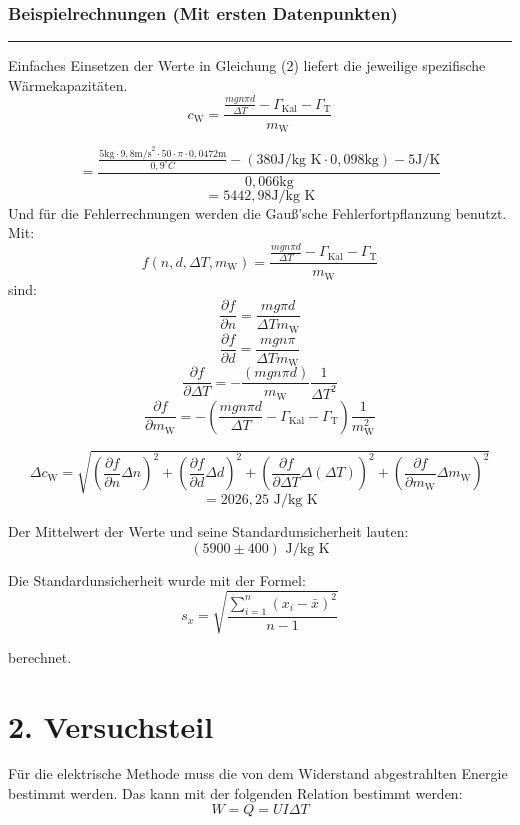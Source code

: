 \documentclass[11pt,a4paper]{article} %
\begin{document}
\subsubsection{Beispielrechnungen (Mit ersten Datenpunkten)}
\hrule
\begin{tcolorbox}[colback=white]
Einfaches Einsetzen der Werte in Gleichung (2) liefert die jeweilige spezifische Wärmekapazitäten. 
$$c_\textrm{W} = \frac{\frac{mgn\pi d}{\Delta T} - \Gamma_{\textrm{Kal}} - \Gamma_{\textrm{T}}}{m_\textrm{W}}$$

$$ =\frac{ \frac{ 5 \textrm{kg} \cdot 9,8 \textrm{m/s}^2 \cdot 50 \cdot \pi \cdot 0,0472 \textrm{m}}{0,9^\circ C} - (380 \textrm{J/kg K} \cdot 0,098 \textrm{kg}) - 5 \textrm{J/K}}{0,066\textrm{kg}}$$
$$ = 5442,98 \textrm{J/kg K} $$
Und für die Fehlerrechnungen werden die Gauß'sche Fehlerfortpflanzung benutzt. Mit:
$$f(n,d,\Delta T,m_\textrm{W}) = \frac{\frac{mgn\pi d}{\Delta T} - \Gamma_{\textrm{Kal}} - \Gamma_{\textrm{T}}}{m_\textrm{W}}$$
sind:
$$ \frac{ \partial f}{\partial n} = \frac{mg\pi d}{\Delta T m_{\textrm{W}}} $$ 
$$ \frac{ \partial f}{\partial d}  = \frac{mgn\pi}{\Delta Tm_{\textrm{W}}}$$
$$ \frac{\partial f}{\partial \Delta T} = -\frac{(mgn\pi d)}{m_\textrm{W}} \frac{1}{\Delta T ^2}$$
$$ \frac{\partial f}{\partial m_{\textrm{W}}} = -(\frac{mgn\pi d}{\Delta T} - \Gamma_{\textrm{Kal}} - \Gamma_{\textrm{T}})
 \frac{1}{m_\textrm{W}^2}$$

$$\Delta c_\textrm{W} = \sqrt{ 
	(\frac{ \partial f}{\partial n} \Delta n)^2
	+(\frac{ \partial f}{\partial d} \Delta d)^2
	+(\frac{\partial f}{\partial \Delta T} \Delta (\Delta T))^2
	+ (\frac{\partial f}{\partial m_{\textrm{W}}} \Delta m_{\textrm{W}})^2 }
$$
$$ = 2026,25 \textrm{ J/kg K} $$

\end{tcolorbox}

Der Mittelwert der Werte und seine Standardunsicherheit lauten:
$$(5900 \pm 400) \textrm{ J/kg K}$$

Die Standardunsicherheit wurde mit der Formel:
\begin{equation}
s_x = \sqrt{\frac{\sum_{i=1}^{n}(x_i-\bar{x})^2}{n-1}} 
\end{equation}

berechnet. 

\section{2. Versuchsteil}

Für die elektrische Methode muss die von dem Widerstand abgestrahlten Energie bestimmt werden. Das kann mit der folgenden Relation bestimmt werden:
$$ W = Q = UI\Delta T $$
\end{document}
